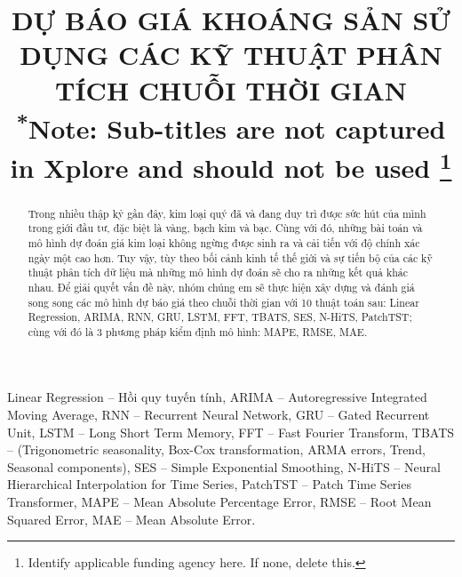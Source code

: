 \documentclass[conference]{IEEEtran}
\begin{document}
\title{DỰ BÁO GIÁ KHOÁNG SẢN SỬ DỤNG CÁC KỸ THUẬT PHÂN TÍCH CHUỖI THỜI GIAN \\
{\footnotesize \textsuperscript{*}Note: Sub-titles are not captured in Xplore and should not be used}
\thanks{Identify applicable funding agency here. If none, delete this.}
}

\author{

}





\begin{abstract}
Trong nhiều thập kỷ gần đây, kim loại quý đã và đang duy trì được sức hút của mình trong giới đầu tư, đặc biệt là vàng, bạch kim và bạc. Cùng với đó, những bài toán và mô hình dự đoán giá kim loại không ngừng được sinh ra và cải tiến với độ chính xác ngày một cao hơn. Tuy vậy, tùy theo bối cảnh kinh tế thế giới và sự tiến bộ của các kỹ thuật phân tích dữ liệu mà những mô hình dự đoán sẽ cho ra những kết quả khác nhau. Để giải quyết vấn đề này, nhóm chúng em sẽ thực hiện xây dựng và đánh giá song song các mô hình dự báo giá theo chuỗi thời gian với 10 thuật toán sau: Linear Regression, ARIMA, RNN, GRU, LSTM, FFT, TBATS, SES, N-HiTS, PatchTST; cùng với đó là 3 phương pháp kiểm định mô hình: MAPE, RMSE, MAE.
\end{abstract}

\begin{IEEEkeywords}
Linear Regression – Hồi quy tuyến tính, ARIMA – Autoregressive Integrated Moving Average, RNN – Recurrent Neural Network, GRU – Gated Recurrent Unit, LSTM – Long Short Term Memory, FFT – Fast Fourier Transform, TBATS – (Trigonometric seasonality, Box-Cox transformation, ARMA errors, Trend, Seasonal components), SES – Simple Exponential Smoothing, N-HiTS – Neural Hierarchical Interpolation for Time Series, PatchTST – Patch Time Series Transformer, MAPE – Mean Absolute Percentage Error, RMSE – Root Mean Squared Error, MAE – Mean Absolute Error.
\end{IEEEkeywords}
\end{document}
